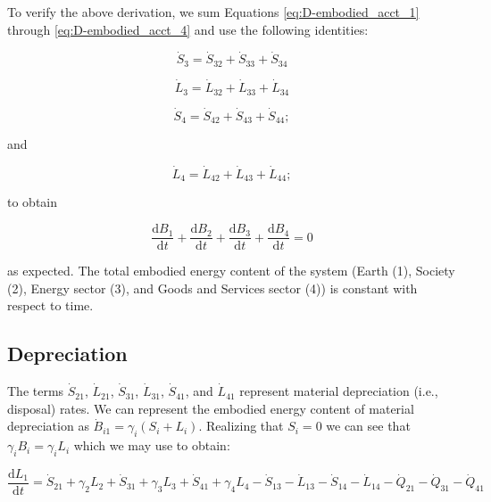 \documentclass[authoryear,preprint,review,12pt]{elsarticle}
\begin{document}
To verify the above derivation, we sum Equations \ref{eq:D-embodied_acct_1} through \ref{eq:D-embodied_acct_4} and use the following identities:

\begin{equation} \label{eq:D-S_sum_3_output}
	\dot{S}_3 = \dot{S}_{32} + \dot{S}_{33} + \dot{S}_{34}
\end{equation}

\begin{equation} \label{eq:D-L_sum_3_output}
	\dot{L}_3 = \dot{L}_{32} + \dot{L}_{33} + \dot{L}_{34}
\end{equation}

\begin{equation} \label{eq:D-S_sum_4_output}
	\dot{S}_4 = \dot{S}_{42} + \dot{S}_{43} + \dot{S}_{44};
\end{equation}

\noindent and

\begin{equation} \label{eq:D-L_sum_4_output}
	\dot{L}_4 = \dot{L}_{42} + \dot{L}_{43} + \dot{L}_{44};
\end{equation}

\noindent to obtain

\begin{equation} \label{eq:D-B_sums_to_zero}
	\frac{\mathrm{d}B_{1}}{\mathrm{d}t} + \frac{\mathrm{d}B_{2}}{\mathrm{d}t} + \frac{\mathrm{d}B_{3}}{\mathrm{d}t} + \frac{\mathrm{d}B_{4}}{\mathrm{d}t} = 0
\end{equation}

\noindent as expected. The total embodied energy content of the system (Earth (1), Society (2), Energy sector (3), and Goods and Services sector (4)) is constant with respect to time.

 \subsection{Depreciation}

The terms $\dot{S}_{21}$, $\dot{L}_{21}$, $\dot{S}_{31}$,  $\dot{L}_{31}$, $\dot{S}_{41}$, and $\dot{L}_{41}$ represent material depreciation (i.e., disposal) rates. We can represent the embodied energy content of material depreciation as $\dot{B}_{i1} = \gamma_i (S_i + L_i)$. Realizing that $S_i = 0$ we can see that $\gamma_i B_i = \gamma_i L_i$ which we may use to obtain:

\begin{equation} \label{eq:D-embodied_acct_1_depreciation}
	\frac{\mathrm{d}L_{1}}{\mathrm{d}t} 	 = \dot{S}_{21} + \gamma_2 L_2 + \dot{S}_{31} + \gamma_3 L_3 + \dot{S}_{41} + \gamma_4 L_4 - \dot{S}_{13} - \dot{L}_{13} - \dot{S}_{14} - \dot{L}_{14} - \dot{Q}_{21} - \dot{Q}_{31} - \dot{Q}_{41}
\end{equation}
\end{document}
